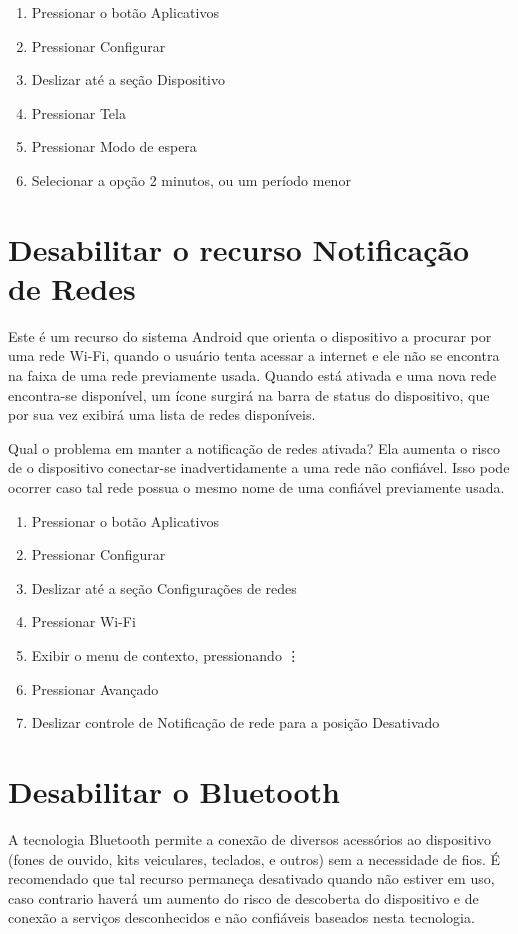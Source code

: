 \begin{enumerate}
\item Pressionar o bot\~ao Aplicativos
\item Pressionar Configurar
\item Deslizar at\'e a se\c c\~ao Dispositivo
\item Pressionar Tela
\item Pressionar Modo de espera
\item Selecionar a op\c c\~ao 2 minutos, ou um per\'iodo menor
\end{enumerate}

\section{Desabilitar o recurso Notifica\c c\~ao de Redes}

Este \'e um recurso do sistema Android que orienta o dispositivo a procurar por uma rede Wi-Fi, quando o usu\'ario tenta acessar a internet e ele n\~ao se encontra na faixa de uma rede previamente usada. Quando est\'a ativada e uma nova rede encontra-se dispon\'ivel, um \'icone surgir\'a na barra de status do dispositivo, que por sua vez exibir\'a uma lista de redes dispon\'iveis.

Qual o problema em manter a notifica\c c\~ao de redes ativada? Ela aumenta o risco de o dispositivo conectar-se inadvertidamente a uma rede n\~ao confi\'avel. Isso pode ocorrer caso tal rede possua o mesmo nome de uma confi\'avel previamente usada.

\begin{enumerate}
\item Pressionar o bot\~ao Aplicativos
\item Pressionar Configurar
\item Deslizar at\'e a se\c c\~ao Configura\c c\~oes de redes
\item Pressionar Wi-Fi
\item Exibir o menu de contexto, pressionando \vdots
\item Pressionar Avan\c cado
\item Deslizar controle de Notifica\c c\~ao de rede para a posi\c c\~ao Desativado
\end{enumerate}

\section{Desabilitar o Bluetooth}

A tecnologia Bluetooth permite a conex\~ao de diversos acess\'orios ao dispositivo (fones de ouvido, kits veiculares, teclados, e outros) sem a necessidade de fios. \'E recomendado que tal recurso permane\c ca desativado quando n\~ao estiver em uso, caso contrario haver\'a um aumento do risco de descoberta do dispositivo e de conex\~ao a servi\c cos desconhecidos e n\~ao confi\'aveis baseados nesta tecnologia.

